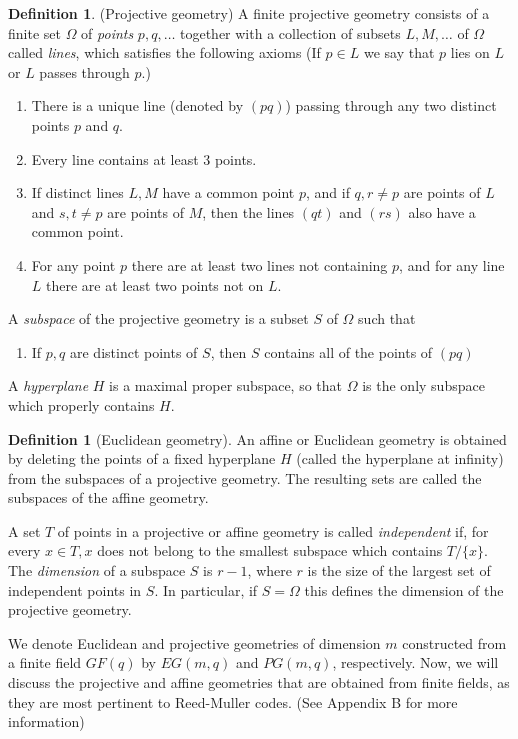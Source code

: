 \documentclass[12pt,twoside]{reedthesis}
\theoremstyle{definition}
\newtheorem{definition}[theorem]{Definition}
\begin{document}
\begin{definition}(Projective geometry) A finite projective geometry consists of a finite set $\Omega$ of \textit{points} $p, q, \ldots$ together with a collection of subsets $L, M, \ldots$ of $\Omega$ called \textit{lines}, which satisfies the following axioms (If $p \in L$ we say that $p$ lies on $L$ or $L$ passes through $p$.)
\begin{enumerate}
\item There is a unique line (denoted by $(pq)$) passing through any two distinct points $p$ and $q$.
\item Every line contains at least 3 points.
\item If distinct lines $L, M$ have a common point $p$, and if $q,  r\neq p$ are points of $L$ and $s, t\neq p$ are points of $M$, then the lines $(qt)$ and $(rs)$ also have a common point.
\item For any point $p$ there are at least two lines not containing $p$, and for any line $L$ there are at least two points not on $L$.
\end{enumerate}
A \textit{subspace} of the projective geometry is a subset $S$ of $\Omega$ such that
\begin{enumerate}[resume]
\item If $p,q$ are distinct points of $S$, then $S$ contains all of the points of $(pq)$
\end{enumerate}
A \textit{hyperplane} $H$ is a maximal proper subspace, so that $\Omega$ is the only subspace which properly contains $H$.
\end{definition}

\begin{definition}[Euclidean geometry] An affine or Euclidean geometry is obtained by deleting the points of a fixed hyperplane $H$ (called the hyperplane at infinity) from the subspaces of a projective geometry. The resulting sets are called the subspaces of the affine geometry.

A set $T$ of points in a projective or affine geometry is called \textit{independent} if, for every $x \in T, x$ does not belong to the smallest subspace which contains $T/\{x\}$. The \textit{dimension} of a subspace $S$ is $r-1$, where $r$ is the size of the largest set of independent points in $S$. In particular, if $S = \Omega$ this defines the dimension of the projective geometry.
\end{definition}

We denote Euclidean and projective geometries of dimension $m$ constructed from a finite field $GF(q)$ by $EG(m,q)$ and $PG(m,q)$, respectively. Now, we will discuss the projective and affine geometries that are obtained from finite fields, as they are most pertinent to Reed-Muller codes. (See \citep{macwilliamssloane} Appendix B for more information)
\end{document}
